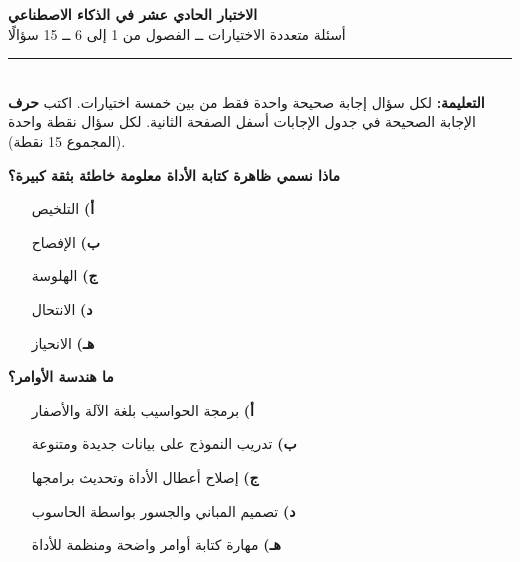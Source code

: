 \documentclass[11pt,a4paper]{article}
\begin{document}
\begin{center}
{\Large\khatt\textbf{الاختبار الحادي عشر في الذكاء الاصطناعي}}\\[2pt]
{\normalsize أسئلة متعددة الاختيارات ــ الفصول من 1 إلى 6 ــ 15 سؤالًا}
\end{center}
\vspace{-4pt}\rule{\textwidth}{0.6pt}\\
{\small\textbf{التعليمة:} لكل سؤال إجابة صحيحة واحدة فقط من بين خمسة اختيارات.
اكتب \textbf{حرف} الإجابة الصحيحة في جدول الإجابات أسفل الصفحة الثانية.
لكل سؤال نقطة واحدة (المجموع 15 نقطة).}
\vspace{-2pt}
\begin{multicols}{2}

\noindent\begin{minipage}{\linewidth}
\hangindent=0.7cm\textbf{ماذا نسمي ظاهرة كتابة الأداة معلومة خاطئة بثقة كبيرة؟}
\begin{itemize}[leftmargin=0.95cm, labelsep=4pt, itemsep=0pt, topsep=2pt, parsep=0pt]
  \item[\textbf{أ)}] التلخيص
  \item[\textbf{ب)}] الإفصاح
  \item[\textbf{ج)}] الهلوسة
  \item[\textbf{د)}] الانتحال
  \item[\textbf{هـ)}] الانحياز
\end{itemize}
\end{minipage}\par\vspace{7pt plus 4pt}
\noindent\begin{minipage}{\linewidth}
\hangindent=0.7cm\textbf{ما هندسة الأوامر؟}
\begin{itemize}[leftmargin=0.95cm, labelsep=4pt, itemsep=0pt, topsep=2pt, parsep=0pt]
  \item[\textbf{أ)}] برمجة الحواسيب بلغة الآلة والأصفار
  \item[\textbf{ب)}] تدريب النموذج على بيانات جديدة ومتنوعة
  \item[\textbf{ج)}] إصلاح أعطال الأداة وتحديث برامجها
  \item[\textbf{د)}] تصميم المباني والجسور بواسطة الحاسوب
  \item[\textbf{هـ)}] مهارة كتابة أوامر واضحة ومنظمة للأداة
\end{itemize}
\end{minipage}\par\vspace{7pt plus 4pt}

\end{multicols}
\end{document}
